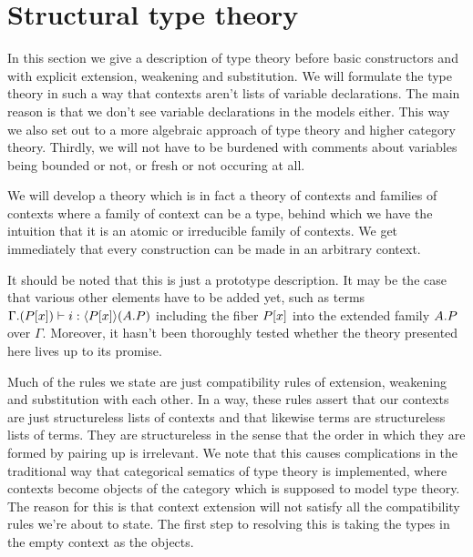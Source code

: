 \section{Structural type theory}\label{tt}
In this section we give a description of type theory before basic
constructors and with explicit extension, weakening and substitution. We will
formulate the type theory in such a way that contexts aren't lists of variable
declarations. The main reason is that we don't see variable declarations in the
models either. This way we also set out to a more algebraic approach of type
theory and higher category theory. Thirdly, we will not have to be burdened with
comments about variables being bounded or not, or fresh or not occuring at all.

We will develop a theory which is in fact a theory of contexts and families of
contexts where a family of context can be a type, behind which we have the
intuition that it is an atomic or irreducible family of contexts. We get immediately
that every construction can be made in an arbitrary context. 

It should be noted that this is just a prototype description. It may be the case
that various other elements have to be added yet, such as terms
$\jterm{{\Gamma}{\subst{x}{P}}}{\ctxwk{\subst{x}{P}}{\ctxext{A}{P}}}{i}$
including the fiber $\subst{x}{P}$ into the extended family $\ctxext{A}{P}$ over
$\Gamma$. Moreover, it hasn't been thoroughly tested whether the theory presented
here lives up to its promise.

Much of the rules we state are just compatibility rules of extension, weakening
and substitution with each other. In a way, these rules assert that our contexts
are just structureless lists of contexts and that likewise terms are structureless
lists of terms. They are structureless in the sense that the order in which
they are formed by pairing up is irrelevant. We note that this causes complications
in the traditional way that categorical sematics of type theory is implemented,
where contexts become objects of the category which is supposed to model type
theory. The reason for this is that context extension will not satisfy all the
compatibility rules we're about to state. The first step to resolving this is taking
the types in the empty context as the objects. 

